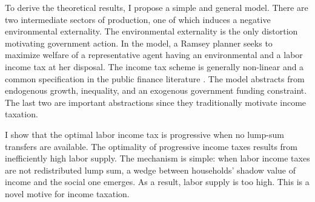 To derive the theoretical results, I propose a simple and general model. There are two intermediate sectors of production, one of which induces a negative environmental externality. The environmental externality is the only distortion motivating government action. In the model, a Ramsey planner seeks to maximize welfare of a representative agent having  an environmental and a labor income tax at her disposal. The income tax scheme is generally non-linear and a common specification in the public finance literature \citep[e.g.][]{Benabou2002TaxEfficiency, Heathcote2017OptimalFramework}.
The model abstracts from  endogenous growth, inequality, and an exogenous government funding constraint. The last two are important abstractions since they traditionally motivate income taxation.

I show that the optimal labor income tax is progressive when no lump-sum transfers are available. 
The optimality of progressive income taxes results from inefficiently high labor supply. The mechanism is simple: when labor income taxes are not redistributed lump sum, a wedge between households' shadow value of income and the social one emerges.  As a result, labor supply is too high. 
This is a novel motive for income taxation.
  
